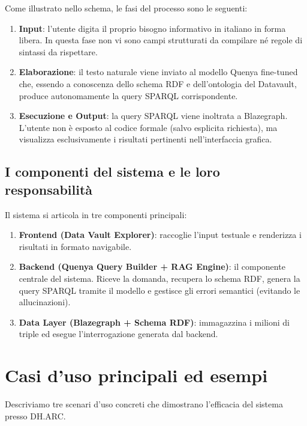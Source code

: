 \newpage
        Come illustrato nello schema, le fasi del processo sono le seguenti:
        \begin{enumerate}
            \item \textbf{Input}: l'utente digita il proprio bisogno informativo in italiano in forma libera. In questa fase non vi sono campi strutturati da compilare né regole di sintassi da rispettare.
            \item \textbf{Elaborazione}: il testo naturale viene inviato al modello Quenya fine-tuned che, essendo a conoscenza dello schema RDF e dell'ontologia del Datavault, produce autonomamente la query SPARQL corrispondente.
            \item \textbf{Esecuzione e Output}: la query SPARQL viene inoltrata a Blazegraph. L'utente non è esposto al codice formale (salvo esplicita richiesta), ma visualizza esclusivamente i risultati pertinenti nell'interfaccia grafica.
        \end{enumerate}

    \subsection{I componenti del sistema e le loro responsabilità}\label{subsec:componenti}
        Il sistema si articola in tre componenti principali:
        \begin{enumerate}
            \item \textbf{Frontend (Data Vault Explorer)}: raccoglie l'input testuale e renderizza i risultati in formato navigabile.
            \item \textbf{Backend (Quenya Query Builder + RAG Engine)}: il componente centrale del sistema. Riceve la domanda, recupera lo schema RDF, genera la query SPARQL tramite il modello e gestisce gli errori semantici (evitando le allucinazioni).
            \item \textbf{Data Layer (Blazegraph + Schema RDF)}: immagazzina i milioni di triple ed esegue l'interrogazione generata dal backend.
        \end{enumerate}

\newpage
\section{Casi d'uso principali ed esempi}\label{sec:casiduso}

    Descriviamo tre scenari d'uso concreti che dimostrano l'efficacia del sistema presso DH.ARC.\@

